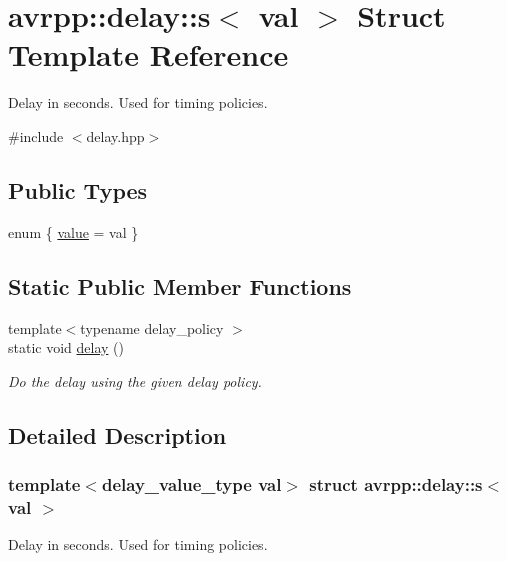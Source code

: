 \hypertarget{structavrpp_1_1delay_1_1s}{
\section{avrpp::delay::s$<$ val $>$ Struct Template Reference}
\label{structavrpp_1_1delay_1_1s}
}


Delay in seconds. Used for timing policies.  




{\ttfamily \#include $<$delay.hpp$>$}

\subsection*{Public Types}
\begin{DoxyCompactItemize}
\item 
enum \{ \hyperlink{structavrpp_1_1delay_1_1s_ab6c5878a297092980e1e60dfb865df05af05360c9b956726589d6302a06fd5f83}{value} =  val
 \}
\end{DoxyCompactItemize}
\subsection*{Static Public Member Functions}
\begin{DoxyCompactItemize}
\item 
{\footnotesize template$<$typename delay\_\-policy $>$ }\\static void \hyperlink{structavrpp_1_1delay_1_1s_a9c3be8ea14ca824e404ac64d9a5899ba}{delay} ()
\begin{DoxyCompactList}\small\item\em Do the delay using the given delay policy. \item\end{DoxyCompactList}\end{DoxyCompactItemize}


\subsection{Detailed Description}
\subsubsection*{template$<$delay\_\-value\_\-type val$>$ struct avrpp::delay::s$<$ val $>$}

Delay in seconds. Used for timing policies. 

